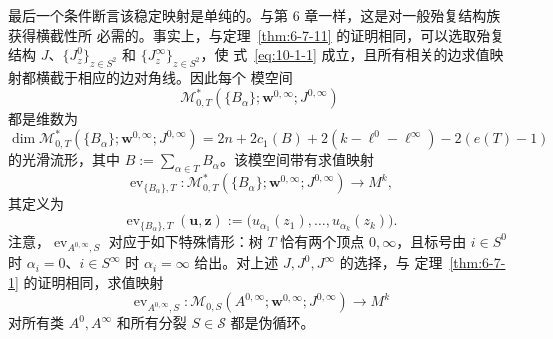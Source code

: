 最后一个条件断言该稳定映射是单纯的。与第 6 章一样，这是对一般殆复结构族获得横截性所
必需的。事实上，与定理~\ref{thm:6-7-11} 的证明相同，可以选取殆复结构
$J$、$\{J_z^0\}_{z\in S^2}$ 和 $\{J_z^\infty\}_{z\in S^2}$，使
式~\eqref{eq:10-1-1} 成立，且所有相关的边求值映射都横截于相应的边对角线。因此每个
模空间
\[
  \mathcal M_{0,T}^*(\{B_\alpha\};\mathbf w^{0,\infty};J^{0,\infty})
\]
都是维数为
\[
  \dim\mathcal M_{0,T}^*(\{B_\alpha\};\mathbf w^{0,\infty};J^{0,\infty})
  =2n+2c_1(B)+2(k-\ell^0-\ell^\infty)-2(e(T)-1)
\]
的光滑流形，其中 $B:=\sum_{\alpha\in T}B_\alpha$。该模空间带有求值映射
\[
  \operatorname{ev}_{\{B_\alpha\},T}:
  \mathcal M_{0,T}^*(\{B_\alpha\};\mathbf w^{0,\infty};J^{0,\infty})
  \longrightarrow M^k,
\]
其定义为
\[
  \operatorname{ev}_{\{B_\alpha\},T}(\mathbf u,\mathbf z)
  :=\bigl(u_{\alpha_1}(z_1),\ldots,u_{\alpha_k}(z_k)\bigr).
\]
注意，$\operatorname{ev}_{A^{0,\infty},S}$ 对应于如下特殊情形：树 $T$ 恰有两个顶点
$0,\infty$，且标号由 $i\in S^0$ 时 $\alpha_i=0$、$i\in S^\infty$ 时
$\alpha_i=\infty$ 给出。对上述 $J,J^0,J^\infty$ 的选择，与
定理~\ref{thm:6-7-1} 的证明相同，求值映射
\[
  \operatorname{ev}_{A^{0,\infty},S}:
  \mathcal M_{0,S}(A^{0,\infty};\mathbf w^{0,\infty};J^{0,\infty})
  \longrightarrow M^k
\]
对所有类 $A^0,A^\infty$ 和所有分裂 $S\in\mathcal S$ 都是伪循环。

